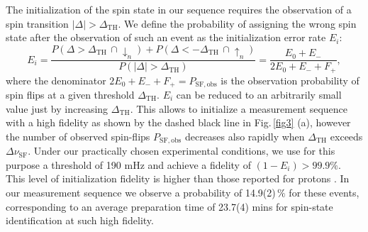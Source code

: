 \documentclass[12pt,preprint%
]{elsarticle}
\begin{document}
The initialization of the spin state in our sequence requires the observation of a spin transition $|\Delta| > \Delta_{\mathrm{TH}}$. We define the probability of assigning the wrong spin state after the observation of such an event as the initialization error rate $E_i$:
\begin{equation}
E_{i} = \frac{P(\Delta>\Delta_{\mathrm{TH}}\,\cap\downarrow_n) + P(\Delta<-\Delta_{\mathrm{TH}}\,\cap\uparrow_n)}{P( \left|\Delta\right|>\Delta_{\mathrm{TH}})}  = 
\frac{E_0 + E_-}{2 E_0 + E_- + F_+},
\end{equation}
where the denominator $2 E_0 + E_- + F_+ = P_{\mathrm{SF,obs}}$ is the observation probability of spin flips at a given threshold $\Delta_{\mathrm{TH}}$. $E_i$ can be reduced to an arbitrarily small value just by increasing $\Delta_{\mathrm{TH}}$. This allows to initialize a measurement sequence with a high fidelity as shown by the dashed black line in Fig.$\,$\ref{fig3} (a), however the number of observed spin-flips $P_{\mathrm{SF,obs}}$ decreases also rapidly when $\Delta_{\mathrm{TH}}$ exceeds $\Delta\nu_\mathrm{SF}$. Under our practically chosen experimental conditions, we use for this purpose a threshold of 190 mHz and achieve a fidelity of $(1-E_{i}) > 99.9 \%$. This level of initialization fidelity is higher than those reported for protons \cite{MooserPRL2013,JackPRL2013}. In our measurement sequence we observe a probability of 14.9(2)$\,\%$ for these events, corresponding to an average preparation time of 23.7(4) mins for spin-state identification at such high fidelity.
\end{document}
